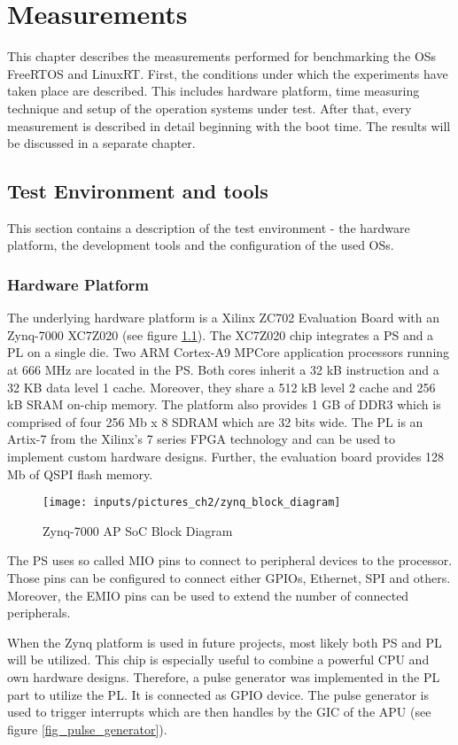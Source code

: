 \chapter{Measurements}\label{ch_measurements}
This chapter describes the measurements performed for benchmarking the \acp{OS} FreeRTOS and LinuxRT.
First, the conditions under which the experiments have taken place are described.
This includes hardware platform, time measuring technique and setup of the operation systems under test.
After that, every measurement is described in detail beginning with the boot time.
The results will be discussed in a separate chapter.

\section{Test Environment and tools}
This section contains a description of the test environment - the hardware platform, the development tools and the configuration of the used \acp{OS}.
\subsection{Hardware Platform}
The underlying hardware platform is a Xilinx ZC702 Evaluation Board \cite{xilinx:zc702_ev_board} with an Zynq-7000 XC7Z020 \cite{xilinx:zynq7000} (see figure \ref{fig_zynq_block_diagram}).
The XC7Z020 chip integrates a \ac{PS} and a \ac{PL} on a single die.
Two ARM Cortex-A9 MPCore application processors running at 666 MHz are located in the \ac{PS}.
Both cores inherit a 32 kB instruction and a 32 KB data level 1 cache.
Moreover, they share a 512 kB level 2 cache and 256 kB SRAM on-chip memory.
The platform also provides 1 GB of DDR3 which is comprised of four 256 Mb x 8 SDRAM which are 32 bits wide. 
The \ac{PL} is an Artix-7 from the Xilinx's 7 series \ac{FPGA} technology and can be used to implement custom hardware designs.
Further, the evaluation board provides 128 Mb of \ac{QSPI} flash memory.

\begin{figure}[htb]
		\begin{center}
			\texttt{[image: inputs/pictures\_ch2/zynq\_block\_diagram]}
			\caption[Zynq-7000 AP SoC Block Diagram]{Zynq-7000 AP SoC Block Diagram \cite{xilinx:zc702_ev_board}} \label{fig_zynq_block_diagram}
		\end{center}
\end{figure} 

The \ac{PS} uses so called \ac{MIO} pins to connect to peripheral devices to the processor.
Those pins can be configured to connect either \acp{GPIO}, Ethernet, \ac{SPI} and others.
Moreover, the \ac{EMIO} pins can be used to extend the number of connected peripherals.
\par
When the Zynq platform is used in future projects, most likely both \ac{PS} and \ac{PL} will be utilized.
This chip is especially useful to combine a powerful \ac{CPU} and own hardware designs.
Therefore, a pulse generator was implemented in the \ac{PL} part to utilize the \ac{PL}.
It is connected as \ac{GPIO} device.
The pulse generator is used to trigger interrupts which are then handles by the \ac{GIC} of the \ac{APU} (see figure \ref{fig_pulse_generator}). 


